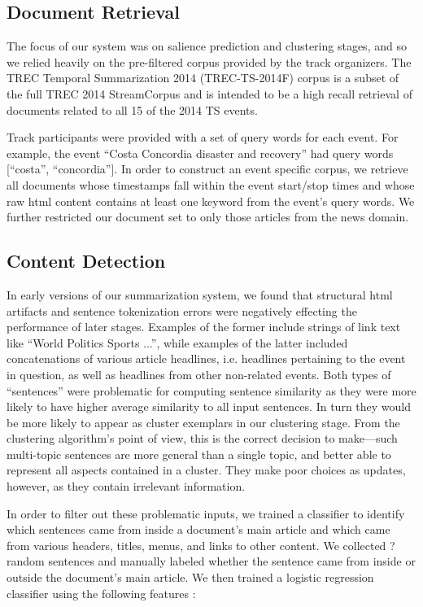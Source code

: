 \documentclass[10pt]{article} \usepackage{url} \usepackage{color}
\begin{document}
\subsection{Document Retrieval}\label{subsec:Document Retrieval}

The focus of our system was on salience prediction and clustering stages, and
so we relied heavily on the pre-filtered corpus provided by the track 
organizers. The TREC Temporal Summarization 2014 (TREC-TS-2014F) corpus is
a subset of the full TREC 2014 StreamCorpus and is
intended to be a high recall retrieval of documents related to all 15 of 
the 2014 TS events. 

Track participants were provided with a set of query words for each event.
For example, the event ``Costa Concordia disaster and recovery'' had query
words [``costa'', ``concordia''].
In order to construct an event specific corpus,
we retrieve all documents whose timestamps fall within the event start/stop 
times and whose raw html content contains at least one keyword from the 
event's query words. We further restricted our document set to only those 
articles from the news domain.


\subsection{Content Detection}\label{subsec:Content Detection}

In early versions of our summarization system, we found that structural html
artifacts and sentence tokenization errors
were negatively effecting the performance of later stages. Examples of the 
former include strings of link text like ``World Politics Sports ...'', while
examples of the latter included concatenations of various article headlines,
i.e. headlines pertaining to the event in question, as well as headlines from
other non-related events.
Both types of ``sentences'' were problematic for computing sentence similarity
as they were more likely to have higher average similarity to all input 
sentences. In turn they would be more likely to appear as cluster exemplars
in our clustering stage. From the clustering algorithm's point of view, this
is the correct decision to make---such multi-topic sentences are more general 
than a single topic, and better able to represent all aspects contained in a 
cluster. They make poor choices as updates, however, as they contain 
irrelevant information.

In order to filter out these problematic inputs, we trained a classifier to 
identify which sentences came from inside a document's main article and which
came from various headers, titles, menus, and links to other content. We collected ? random sentences and manually labeled whether the sentence came from
inside or outside the document's main article. We then trained a logistic 
regression classifier using the following features :
\end{document}
